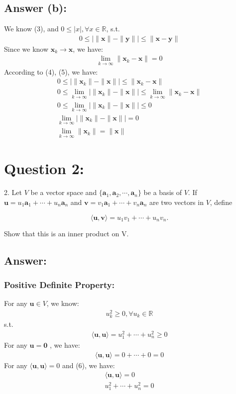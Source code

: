 \documentclass[a4paper,12pt]{article}
\newcommand{\R}{\mathbb{R}}
\begin{document}
\subsection*{Answer (b):}
We know (3), and \(0 \leq |x|, \forall x \in \R\), s.t.
\begin{align}
    0 \leq |\|\bm{x}\| - \|\bm{y}\|| \leq \|\bm{x} - \bm{y}\| 
\end{align}
Since we know \(\bm{x}_k \to \bm{x}\), we have:
\begin{align}
    \lim_{k \to \infty}\|\bm{x}_k - \bm{x}\| = 0
\end{align}
According to (4), (5), we have:
\begin{align*}
    0 \leq |\|\bm{x}_k\| - \|\bm{x}\|| \leq \|\bm{x}_k - \bm{x}\| \\
    0 \leq \lim_{k \to \infty}|\|\bm{x}_k\| - \|\bm{x}\|| \leq \lim_{k \to \infty}\|\bm{x}_k - \bm{x}\| \\
    0 \leq \lim_{k \to \infty}|\|\bm{x}_k\| - \|\bm{x}\|| \leq 0\\
    \lim_{k \to \infty}|\|\bm{x}_k\| - \|\bm{x}\|| = 0  \\
    \lim_{k \to \infty}\|\bm{x}_k\| = \|\bm{x}\|
\end{align*}
\section*{Question 2:}

2. Let \(V\) be a vector space and \(\{\bm{a}_1,\bm{a}_2,\cdots,\bm{a}_n\}\) be a basis of \(V\). If \(
\bm{u} = u_1\bm{a}_1 + \cdots + u_n\bm{a}_n\) and \(\bm{v} = v_1\bm{a}_1 + \cdots + v_n\bm{a}_n\) are two vectors in \(V\), define

\[
    \langle \bm{u}, \bm{v}\rangle = u_1v_1 + \cdots + u_nv_n.
\]

Show that this is an inner product on V.

\subsection*{Answer:}
\subsubsection*{Positive Definite Property:}
For any \(\bm{u} \in V\), we know:
\begin{align}
    u_k^2 \geq 0, \forall u_k \in \R
\end{align}
s.t.
\begin{align*}
    \langle\bm{u}, \bm{u} \rangle  = u_1^2 + \cdots + u_n^2 \geq 0 
\end{align*}
For any \(\bm{u} = \bm{0}\) , we have:
\begin{align*}
    \langle \bm{u},\bm{u} \rangle = 0 + \cdots + 0 = 0
\end{align*}
For any \(\langle\bm{u}, \bm{u}\rangle = 0\) and (6), we have:
\begin{align*}
    \langle\bm{u}, \bm{u}\rangle = 0 \\
    u_1^2 + \cdots + u_n^2 = 0
\end{align*}
\end{document}
